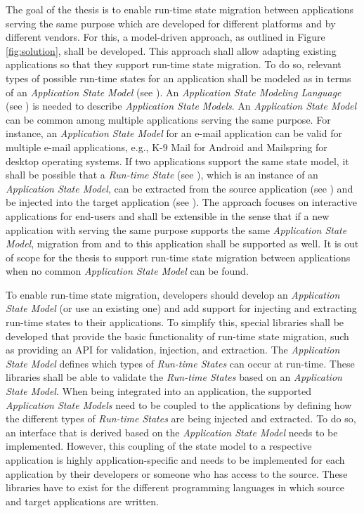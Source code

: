 The goal of the thesis is to enable run-time state migration between applications serving the same purpose which are developed for different platforms and by different vendors. 
For this, a model-driven approach, as outlined in Figure \ref{fig:solution}, shall be developed. 
This approach shall allow adapting existing applications so that they support run-time state migration.
To do so, relevant types of possible run-time states for an application shall be modeled as in terms of an \textit{Application State Model} (see \fcircone).
An \textit{Application State Modeling Language} (see \fcirctwo) is needed to describe \textit{Application State Models}.
An \textit{Application State Model} can be common among multiple applications serving the same purpose. 
For instance, an \textit{Application State Model} for an e-mail application can be valid for multiple e-mail applications, e.g., K-9 Mail for Android and Mailspring for desktop operating systems. 
If two applications support the same state model, it shall be possible that a \textit{Run-time State} (see \fcircthree), which is an instance of an \textit{Application State Model}, can be extracted from the source application (see \fcircfour) and be injected into the target application (see \fcircfive). 
The approach focuses on interactive applications for end-users and shall be extensible in the sense that if a new application with serving the same purpose supports the same \textit{Application State Model}, migration from and to this application shall be supported as well. It is out of scope for the thesis to support run-time state migration between applications when no common \textit{Application State Model} can be found. 

To enable run-time state migration, developers should develop an \textit{Application State Model} (or use an existing one) and add support for injecting and extracting run-time states to their applications. 
To simplify this, special libraries shall be developed that provide the basic functionality of run-time state migration, such as providing an API for validation, injection, and extraction.
The \textit{Application State Model} defines which types of \textit{Run-time States} can occur at run-time.
These libraries shall be able to validate the \textit{Run-time States} based on an \textit{Application State Model}.
When being integrated into an application, the supported \textit{Application State Models} need to be coupled to the applications by defining how the different types of \textit{Run-time States} are being injected and extracted.
To do so, an interface that is derived based on the \textit{Application State Model} needs to be implemented.
However, this coupling of the state model to a respective application is highly application-specific and needs to be implemented for each application by their developers or someone who has access to the source.
These libraries have to exist for the different programming languages in which source and target applications are written. 

